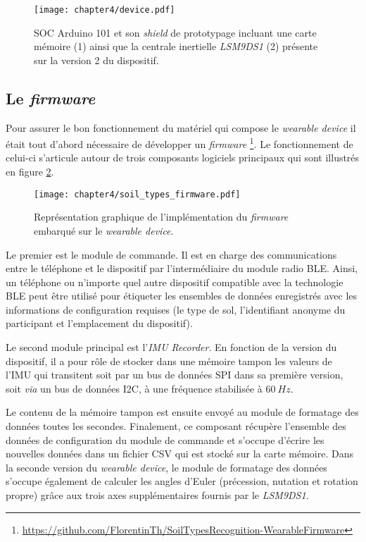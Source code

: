 \begin{figure}[H]
	\centering
	\texttt{[image: chapter4/device.pdf]}
        \caption{\acs{SOC} Arduino 101 et son \textit{shield} de prototypage incluant une carte mémoire (1) ainsi que la centrale inertielle \textit{LSM9DS1} (2) présente sur la version 2 du dispositif.}
	\label{fig:device}
\end{figure}

\subsection{Le \textit{firmware}}


Pour assurer le bon fonctionnement du matériel qui compose le \textit{wearable device} il était tout d'abord nécessaire de développer un \textit{firmware} \footnote{\url{https://github.com/FlorentinTh/SoilTypesRecognition-WearableFirmware}}. Le fonctionnement de celui-ci s'articule autour de trois composants logiciels principaux qui sont illustrés en figure \ref{fig:soil_types_firmware}.

\begin{figure}[H]
	\centering
	\texttt{[image: chapter4/soil\_types\_firmware.pdf]}
        \caption{Représentation graphique de l'implémentation du \textit{firmware} embarqué sur le \textit{wearable device}.}
	\label{fig:soil_types_firmware}
\end{figure}

Le premier est le module de commande. Il est en charge des communications entre le téléphone et le dispositif par l'intermédiaire du module radio \acs{BLE}. Ainsi, un téléphone ou n'importe quel autre dispositif compatible avec la technologie \acs{BLE} peut être utilisé pour étiqueter les ensembles de données enregistrés avec les informations de configuration requises (le type de sol, l'identifiant anonyme du participant et l'emplacement du dispositif).

Le second module principal est l'\textit{\acs{IMU} Recorder}. En fonction de la version du dispositif, il a pour rôle de stocker dans une mémoire tampon les valeurs de l'\acs{IMU} qui transitent soit par un bus de données \ac{SPI} dans sa première version, soit \textit{via} un bus de données \ac{I2C}, à une fréquence stabilisée à $60\: Hz$.

Le contenu de la mémoire tampon est ensuite envoyé au module de formatage des données toutes les secondes. Finalement, ce composant récupère l'ensemble des données de configuration du module de commande et s'occupe d'écrire les nouvelles données dans un fichier \ac{CSV} qui est stocké sur la carte mémoire. Dans la seconde version du \textit{wearable device}, le module de formatage des données s'occupe également de calculer les angles d'Euler (précession, nutation et rotation propre) grâce aux trois axes supplémentaires fournis par le \textit{LSM9DS1}.

